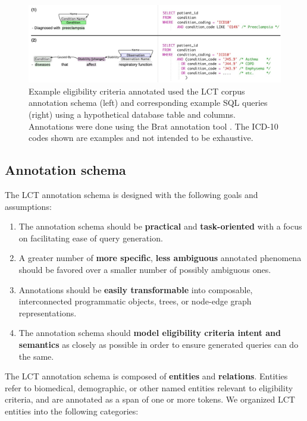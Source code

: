\documentclass[../main.tex]{subfiles}
\begin{document}
\begin{figure}[h!]
  \includegraphics[scale=0.57]{_Figures/Aim1/aim1_lct_text2sql.pdf}  
  \caption{Example eligibility criteria annotated used the LCT corpus annotation schema (left) and corresponding example SQL queries (right) using a hypothetical database table and columns. Annotations were done using the Brat annotation tool \cite{stenetorp2012brat}. The ICD-10 codes shown are examples and not intended to be exhaustive.}
  \label{aim1_fig_lct_text2sql}
\end{figure}

\subsection{Annotation schema}

The LCT annotation schema is designed with the following goals and assumptions:

\begin{enumerate}
    \item The annotation schema should be \textbf{practical} and  \textbf{task-oriented} with a focus on facilitating ease of query generation. 
    \item A greater number of \textbf{more specific}, \textbf{less ambiguous} annotated phenomena should be favored over a smaller number of possibly ambiguous ones.
    \item Annotations should be \textbf{easily transformable} into composable, interconnected programmatic objects, trees, or node-edge graph representations.
    \item The annotation schema should \textbf{model eligibility criteria intent and semantics} as closely as possible in order to ensure generated queries can do the same.
\end{enumerate}

The LCT annotation schema is composed of \textbf{entities} and 
\textbf{relations}. Entities refer to biomedical, demographic, or other named entities relevant to eligibility criteria, and are annotated as a span of one or more tokens. We organized LCT entities into the following categories:
\end{document}
